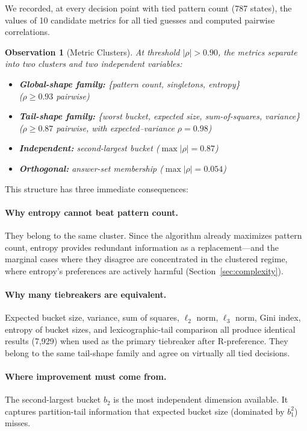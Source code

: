 \documentclass[11pt]{article}
\newtheorem{observation}{Observation}
\begin{document}
	We recorded, at every decision point with tied pattern count (787 states), the values of 10 candidate metrics for all tied guesses and computed pairwise correlations.
	
	\begin{observation}[Metric Clusters]\label{obs:clusters}
		At threshold $|\rho| > 0.90$, the metrics separate into two clusters and two independent variables:
		\begin{itemize}[nosep]
			\item \textbf{Global-shape family:} \{pattern count, singletons, entropy\}\\ ($\rho \geq 0.93$ pairwise)
			\item \textbf{Tail-shape family:} \{worst bucket, expected size, sum-of-squares, variance\}\\ ($\rho \geq 0.87$ pairwise, with expected--variance $\rho = 0.98$)
			\item \textbf{Independent:} second-largest bucket ($\max |\rho| = 0.87$)
			\item \textbf{Orthogonal:} answer-set membership ($\max |\rho| = 0.054$)
		\end{itemize}
	\end{observation}
	
	This structure has three immediate consequences:
	
	\paragraph{Why entropy cannot beat pattern count.}
	They belong to the same cluster.  Since the algorithm already maximizes pattern count, entropy provides redundant information as a replacement---and the marginal cases where they disagree are concentrated in the clustered regime, where entropy's preferences are actively harmful (Section~\ref{sec:complexity}).
	
	\paragraph{Why many tiebreakers are equivalent.}
	Expected bucket size, variance, sum of squares, $\ell_2$ norm, $\ell_3$ norm, Gini index, entropy of bucket sizes, and lexicographic-tail comparison all produce identical results (7,929) when used as the primary tiebreaker after R-preference.  They belong to the same tail-shape family and agree on virtually all tied decisions.
	
	\paragraph{Where improvement must come from.}
	The second-largest bucket $b_2$ is the most independent dimension available.  It captures partition-tail information that expected bucket size (dominated by $b_1^2$) misses.
	
\end{document}
